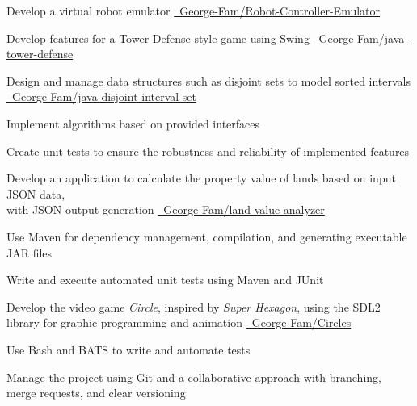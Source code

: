 \documentclass[letterpaper,10pt]{article}
\begin{document}
  \begin{resume_list}
    \item Develop a virtual robot emulator {\small \href{https://github.com/George-Fam/Robot-Controller-Emulator}{\faGithubSquare\ George-Fam/Robot-Controller-Emulator}}
    \vspace{2pt}
    \item Develop features for a Tower Defense-style game using Swing {\small \href{https://github.com/George-Fam/java-tower-defense}{\faGithubSquare\ George-Fam/java-tower-defense}}
    \vspace{2pt}
    \item Design and manage data structures such as disjoint sets to model sorted intervals {\small \href{https://github.com/George-Fam/java-disjoint-interval-set}{\faGithubSquare\ George-Fam/java-disjoint-interval-set}}
    \vspace{2pt}
    \item Implement algorithms based on provided interfaces
    \vspace{2pt}
    \item Create unit tests to ensure the robustness and reliability of implemented features
  \end{resume_list}

  \begin{resume_list}
    \item Develop an application to calculate the property value of lands based on input JSON data,\\ with JSON output generation {\small \href{https://github.com/George-Fam/land-value-analyzer}{\faGithubSquare\ George-Fam/land-value-analyzer}}
    \vspace{2pt}
    \item Use Maven for dependency management, compilation, and generating executable JAR files
    \vspace{2pt}
    \item Write and execute automated unit tests using Maven and JUnit
  \end{resume_list}
  
  \begin{resume_list}
    \item Develop the video game \textit{Circle}, inspired by \textit{Super Hexagon}, using the SDL2 library for graphic programming and animation {\small \href{https://github.com/George-Fam/Circles}{\faGithubSquare\ George-Fam/Circles}}
    \vspace{2pt}
    \item Use Bash and BATS to write and automate tests
    \vspace{2pt}
    \item Manage the project using Git and a collaborative approach with branching, merge requests, and clear versioning
  \end{resume_list}
  
\end{document}
